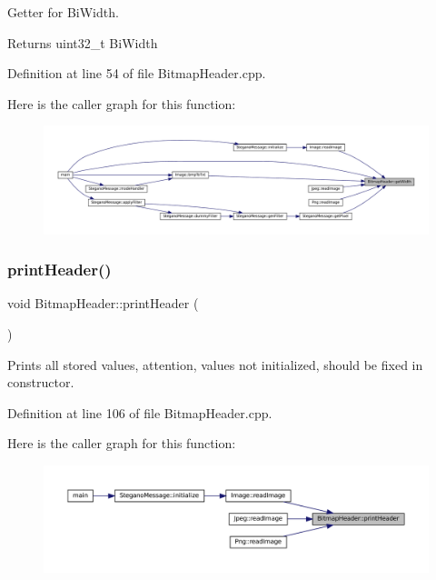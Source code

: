 Getter for Bi\+Width. 

\begin{DoxyReturn}{Returns}
uint32\+\_\+t Bi\+Width 
\end{DoxyReturn}


Definition at line 54 of file Bitmap\+Header.\+cpp.

Here is the caller graph for this function\+:\nopagebreak
\begin{figure}[H]
\begin{center}
\leavevmode
\includegraphics[width=350pt]{classBitmapHeader_af1d36ee9f3315866f05c39c2f4871e09_icgraph}
\end{center}
\end{figure}
\mbox{\label{classBitmapHeader_a72e26bdf3269d382dfbdc76119c1a6aa}} 
\subsubsection{\texorpdfstring{printHeader()}{printHeader()}}
{\footnotesize\ttfamily void Bitmap\+Header\+::print\+Header (\begin{DoxyParamCaption}{ }\end{DoxyParamCaption})}



Prints all stored values, attention, values not initialized, should be fixed in constructor. 



Definition at line 106 of file Bitmap\+Header.\+cpp.

Here is the caller graph for this function\+:\nopagebreak
\begin{figure}[H]
\begin{center}
\leavevmode
\includegraphics[width=350pt]{classBitmapHeader_a72e26bdf3269d382dfbdc76119c1a6aa_icgraph}
\end{center}
\end{figure}
\mbox{\label{classBitmapHeader_aebc19bf8a908f1f7edfc5b10186c9db8}} 
